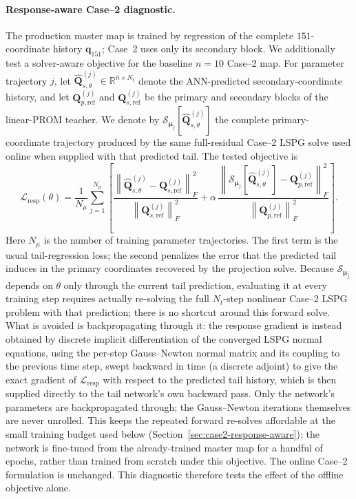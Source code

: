 \documentclass[11pt]{article}
\newcommand{\q}{\mathbf q}
\newcommand{\mub}{\bm\mu}
\begin{document}
\paragraph{Response-aware Case--2 diagnostic.}
The production master map is trained by regression of the complete
\(151\)-coordinate history \(\q_{151}\); Case~2 uses only its secondary
block.  We additionally test a solver-aware objective for the baseline
\(n=10\) Case--2 map.  For parameter trajectory \(j\), let
\(\widehat{\mathbf Q}_{s,\theta}^{(j)}\in\mathbb R^{\bar n\times N_t}\)
denote the ANN-predicted secondary-coordinate history, and let
\(\mathbf Q_{p,\mathrm{ref}}^{(j)}\) and
\(\mathbf Q_{s,\mathrm{ref}}^{(j)}\) be the primary and secondary blocks of
the linear-PROM teacher.  We denote by
\(\mathcal S_{\mub_j}[\widehat{\mathbf Q}_{s,\theta}^{(j)}]\) the complete
primary-coordinate trajectory produced by the same full-residual Case--2
LSPG solve used online when supplied with that predicted tail.  The tested
objective is
\begin{equation}
\mathcal L_{\mathrm{resp}}(\theta)
=
\frac{1}{N_\mu}\sum_{j=1}^{N_\mu}
\left[
\frac{\left\lVert\widehat{\mathbf Q}_{s,\theta}^{(j)}-
\mathbf Q_{s,\mathrm{ref}}^{(j)}\right\rVert_F^2}
{\left\lVert\mathbf Q_{s,\mathrm{ref}}^{(j)}\right\rVert_F^2}
+
\alpha\,
\frac{\left\lVert\mathcal S_{\mub_j}
\left[\widehat{\mathbf Q}_{s,\theta}^{(j)}\right]-
\mathbf Q_{p,\mathrm{ref}}^{(j)}\right\rVert_F^2}
{\left\lVert\mathbf Q_{p,\mathrm{ref}}^{(j)}\right\rVert_F^2}
\right].
\label{eq:case2-response-aware-loss}
\end{equation}
Here \(N_\mu\) is the number of training parameter trajectories.  The first
term is the usual tail-regression loss; the second penalizes the error that
the predicted tail induces in the primary coordinates recovered by the
projection solve.  Because \(\mathcal S_{\mub_j}\) depends on \(\theta\)
only through the current tail prediction, evaluating it at every training
step requires actually re-solving the full \(N_t\)-step nonlinear Case--2
LSPG problem with that prediction; there is no shortcut around this forward
solve.  What is avoided is backpropagating through it: the response gradient is
instead obtained by discrete implicit differentiation of the converged LSPG
normal equations, using the per-step Gauss--Newton normal matrix and its
coupling to the previous time step, swept backward in time (a discrete
adjoint) to give the exact gradient of \(\mathcal L_{\mathrm{resp}}\) with
respect to the predicted tail history, which is then supplied directly to
the tail network's own backward pass.  Only the network's parameters are
backpropagated through; the Gauss--Newton iterations themselves are never
unrolled.  This keeps the repeated forward re-solves affordable at the small
training budget used below (Section~\ref{sec:case2-response-aware}): the
network is fine-tuned from the already-trained master map for a handful of
epochs, rather than trained from scratch under this objective.  The online
Case--2 formulation is unchanged.  This diagnostic therefore tests the
effect of the offline objective alone.
\end{document}

